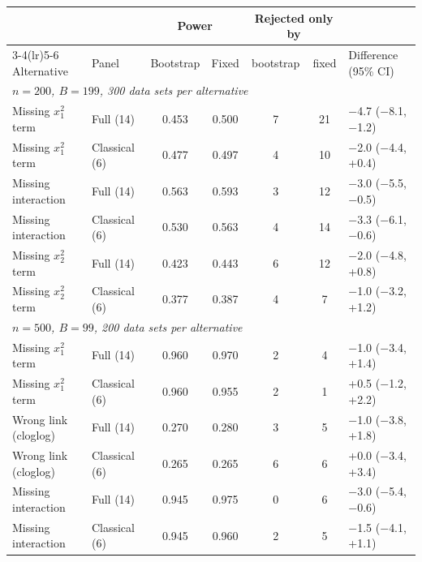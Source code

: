 \begin{tabular}{llccccl}
\toprule
 & & \multicolumn{2}{c}{Power} & \multicolumn{2}{c}{Rejected only by} & \\
\cmidrule(lr){3-4}\cmidrule(lr){5-6}
Alternative & Panel & Bootstrap & Fixed & bootstrap & fixed & Difference (95\% CI) \\
\midrule
\multicolumn{7}{l}{\emph{$n=200$, $B=199$, 300 data sets per alternative}} \\
Missing $x_1^2$ term & Full (14) & 0.453 & 0.500 & 7 & 21 & $-$4.7 ($-$8.1, $-$1.2) \\
Missing $x_1^2$ term & Classical (6) & 0.477 & 0.497 & 4 & 10 & $-$2.0 ($-$4.4, +0.4) \\
Missing interaction & Full (14) & 0.563 & 0.593 & 3 & 12 & $-$3.0 ($-$5.5, $-$0.5) \\
Missing interaction & Classical (6) & 0.530 & 0.563 & 4 & 14 & $-$3.3 ($-$6.1, $-$0.6) \\
Missing $x_2^2$ term & Full (14) & 0.423 & 0.443 & 6 & 12 & $-$2.0 ($-$4.8, +0.8) \\
Missing $x_2^2$ term & Classical (6) & 0.377 & 0.387 & 4 & 7 & $-$1.0 ($-$3.2, +1.2) \\
\multicolumn{7}{l}{\emph{$n=500$, $B=99$, 200 data sets per alternative}} \\
Missing $x_1^2$ term & Full (14) & 0.960 & 0.970 & 2 & 4 & $-$1.0 ($-$3.4, +1.4) \\
Missing $x_1^2$ term & Classical (6) & 0.960 & 0.955 & 2 & 1 & +0.5 ($-$1.2, +2.2) \\
Wrong link (cloglog) & Full (14) & 0.270 & 0.280 & 3 & 5 & $-$1.0 ($-$3.8, +1.8) \\
Wrong link (cloglog) & Classical (6) & 0.265 & 0.265 & 6 & 6 & +0.0 ($-$3.4, +3.4) \\
Missing interaction & Full (14) & 0.945 & 0.975 & 0 & 6 & $-$3.0 ($-$5.4, $-$0.6) \\
Missing interaction & Classical (6) & 0.945 & 0.960 & 2 & 5 & $-$1.5 ($-$4.1, +1.1) \\
\bottomrule
\end{tabular}